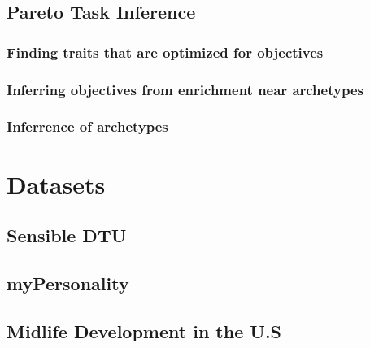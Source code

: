 \documentclass[a4paper]{article}
\begin{document}
	\newpage
	\subsection{Pareto Task Inference \label{subsec:paretoTaskInference}}
	

		\subsubsection{Finding traits that are optimized for objectives \label{subsubsec:ParTIptOne}}
		

		\subsubsection{Inferring objectives from enrichment near archetypes \label{subsubsec:ParTIptTwo}}
		

		\subsubsection{Inferrence of archetypes \label{subsubsec:archetypalAnalysis}}
		

\newpage
\setcounter{figure}{0}
\thispagestyle{plain}


\section{Datasets \label{sec:datasets}}


	\subsection{Sensible DTU \label{subsec:sensibleDTU}}
	

	\subsection{myPersonality \label{subsec:facebook}}
	

	\subsection{Midlife Development in the U.S \label{subsec:MIDUS}}
	
\end{document}
